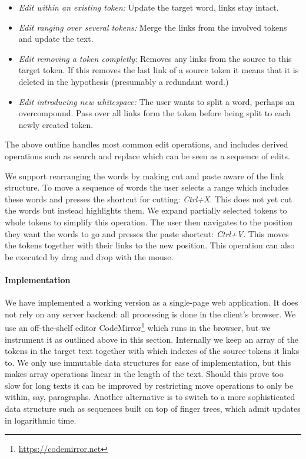 \documentclass[10pt, a4paper]{article}
\begin{document}
\begin{itemize}

\item {\it Edit within an existing token:}
Update the target word, links stay intact.

\item {\it Edit ranging over several tokens:}
Merge the links from the involved tokens and update the text.

\item {\it Edit removing a token completly:}
Removes any links from the source to this target token.
If this removes the last link of a source token it means that
it is deleted in the hypothesis (presumably a redundant word.)

\item {\it Edit introducing new whitespace:}
The user wants to split a word, perhaps an overcompound.
Pass over all links form the token before being split to each newly created token.

\end{itemize}

The above outline handles most common edit operations, and includes derived
operations such as search and replace which can be seen as a sequence of edits.

We support rearranging the words by making cut and paste aware of the link
structure. To move a sequence of words the user selects a range
which includes these words and presses the shortcut for cutting: {\it Ctrl+X}.
This does not yet cut the words but instead highlights them. We expand partially
selected tokens to whole tokens to simplify this operation. The user then
navigates to the position they want the words to go and presses the paste
shortcut: {\it Ctrl+V}. This moves the tokens together with their links to the
new position. This operation can also be executed by drag and drop with the mouse.

\paragraph{Implementation}
We have implemented a working version as a single-page web application.
It does not rely on any server backend: all processing is done in the
client's browser. We use an off-the-shelf editor
CodeMirror\footnote{\url{https://codemirror.net}} which
runs in the browser, but we instrument it as outlined above in this section.
Internally we keep an array of the tokens in the target text together with
which indexes of the source tokens it links to.  We only use immutable
data structures for ease of implementation, but this makes array operations
linear in the length of the text. Should this prove too slow for long texts
it can be improved by restricting move operations to only be within, say,
paragraphs. Another alternative is to switch to a more sophisticated data
structure such as sequences built on top of finger trees, which admit updates
in logarithmic time.
\end{document}
